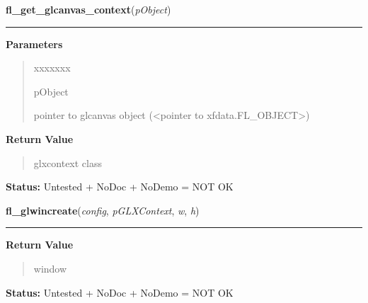 \hspace{.8\funcindent}\begin{boxedminipage}{\funcwidth}

    \raggedright \textbf{fl\_get\_glcanvas\_context}(\textit{pObject})

    \vspace{-1.5ex}

    \rule{\textwidth}{0.5\fboxrule}
\setlength{\parskip}{2ex}
\setlength{\parskip}{1ex}
      \textbf{Parameters}
      \vspace{-1ex}

      \begin{quote}
        \begin{Ventry}{xxxxxxx}

          \item[pObject]

          pointer to glcanvas object ({\textless}pointer to 
          xfdata.FL\_OBJECT{\textgreater})

        \end{Ventry}

      \end{quote}

      \textbf{Return Value}
    \vspace{-1ex}

      \begin{quote}
      glxcontext class

      \end{quote}

\textbf{Status:} Untested + NoDoc + NoDemo = NOT OK



    \end{boxedminipage}

    \label{xformslib:library:fl_glwincreate}

    \vspace{0.5ex}

\hspace{.8\funcindent}\begin{boxedminipage}{\funcwidth}

    \raggedright \textbf{fl\_glwincreate}(\textit{config}, \textit{pGLXContext}, \textit{w}, \textit{h})

    \vspace{-1.5ex}

    \rule{\textwidth}{0.5\fboxrule}
\setlength{\parskip}{2ex}
\setlength{\parskip}{1ex}
      \textbf{Return Value}
    \vspace{-1ex}

      \begin{quote}
      window

      \end{quote}

\textbf{Status:} Untested + NoDoc + NoDemo = NOT OK



    \end{boxedminipage}

